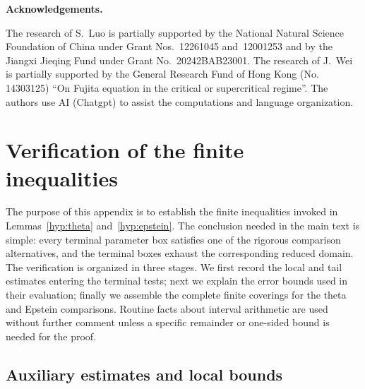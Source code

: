 \documentclass[reqno,english]{amsart}
\theoremstyle{definition}
\newtheorem{open problem}[theorem]{Open Problem}
\theoremstyle{remark}
\theoremstyle{plain}
\numberwithin{equation}{section}
\begin{document}
\bigskip

\noindent
{\bf Acknowledgements.}

The research of S.~Luo is partially supported by the National Natural
Science Foundation of China under Grant Nos.~12261045 and~12001253 and by
the Jiangxi Jieqing Fund under Grant No.~20242BAB23001. The research of
J.~Wei is partially supported by the General Research Fund of Hong Kong (No. 14303125) ``On Fujita equation in the critical or supercritical regime''.  The authors use AI (Chatgpt) to assist the computations and language organization.





\bigskip
\nopagebreak
\appendix
\raggedbottom


\section{Verification of the finite inequalities}\label{app:numerical}

The purpose of this appendix is to establish the finite inequalities invoked in Lemmas~\ref{hyp:theta} and~\ref{hyp:epstein}. The conclusion needed in the main text is simple: every terminal parameter box satisfies one of the rigorous comparison alternatives, and the terminal boxes exhaust the corresponding reduced domain. The verification is organized in three stages. We first record the local and tail estimates entering the terminal tests; next we explain the error bounds used in their evaluation; finally we assemble the complete finite coverings for the theta and Epstein comparisons. Routine facts about interval arithmetic are used without further comment unless a specific remainder or one-sided bound is needed for the proof.

\subsection{Auxiliary estimates and local bounds}\label{app:admissibility}\label{def:certificate}\label{app:verification-ledger}\label{app:constant-checks}\label{T:app:shells}\label{app:theta-local-data}\label{app:kernel-evaluation}\label{app:epstein-local-data}
\end{document}
